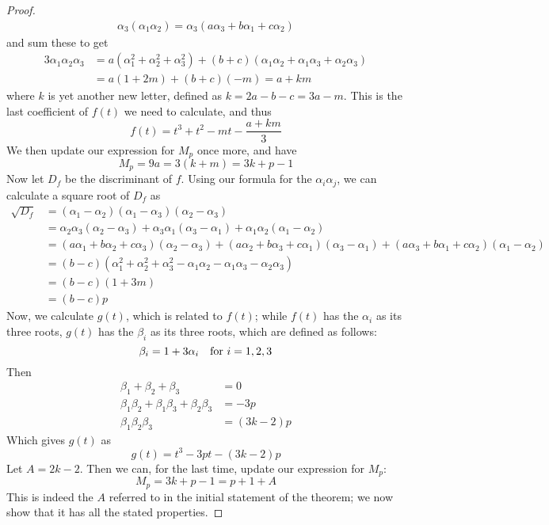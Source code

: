 \begin{proof}
\begin{align*}
	\alpha_3 (\alpha_1 \alpha_2) = \alpha_3 (a\alpha_3 + b\alpha_1 + c\alpha_2)
\end{align*}
and sum these to get
\begin{align*}
	3\alpha_1 \alpha_2 \alpha_3 &= a(\alpha_1^2 + \alpha_2^2 + \alpha_3^2) + (b+c)(\alpha_1\alpha_2 +\alpha_1\alpha_3 +\alpha_2\alpha_3)\\
	&= a(1+2m) +(b+c)(-m) = a + km
\end{align*}
where $k$ is yet another new letter, defined as $k = 2a-b-c=3a-m$. This is the last coefficient of $f(t)$ we need to calculate, and thus
$$f(t) = t^3 + t^2 - mt - \frac{a+km}{3}$$
We then update our expression for $M_p$ once more, and have
$$M_p = 9a = 3(k + m) = 3k + p - 1$$
Now let $D_f$ be the discriminant of $f$. Using our formula for the $\alpha_i \alpha_j$, we can calculate a square root of $D_f$ as
\begin{align*}
	\sqrt{D_f} &= (\alpha_1 - \alpha_2)(\alpha_1 - \alpha_3)(\alpha_2 - \alpha_3)\\
	&= \alpha_2\alpha_3(\alpha_2-\alpha_3) + \alpha_3\alpha_1(\alpha_3-\alpha_1) + \alpha_1\alpha_2(\alpha_1-\alpha_2)\\
	&= (a\alpha_1 + b\alpha_2 + c\alpha_3)(\alpha_2 - \alpha_3) + (a\alpha_2 + b\alpha_3 + c\alpha_1)(\alpha_3 - \alpha_1) + (a\alpha_3 + b\alpha_1 + c\alpha_2)(\alpha_1 - \alpha_2)\\
	&= (b-c)(\alpha_1^2 + \alpha_2^2 + \alpha_3^2 - \alpha_1\alpha_2 - \alpha_1\alpha_3 - \alpha_2\alpha_3)\\
	&= (b-c)(1 + 3m)\\
	&= (b-c)p
\end{align*}
Now, we calculate $g(t)$, which is related to $f(t)$; while $f(t)$ has the $\alpha_i$ as its three roots, $g(t)$ has the $\beta_i$ as its three roots, which are defined as follows:
$$\beta_i = 1 + 3\alpha_i\quad \text{for } i=1,2,3$$
Then
\begin{align*}
	\beta_1 + \beta_2 + \beta_3 &= 0\\
	\beta_1\beta_2 + \beta_1\beta_3 + \beta_2\beta_3 &= -3p\\
	\beta_1\beta_2\beta_3 &= (3k-2)p
\end{align*}
Which gives $g(t)$ as
$$g(t) = t^3 - 3pt - (3k-2)p$$
Let $A = 2k - 2$. Then we can, for the last time, update our expression for $M_p$:
$$M_p = 3k + p - 1 = p + 1 + A$$
This is indeed the $A$ referred to in the initial statement of the theorem; we now show that it has all the stated properties.


\end{proof}
